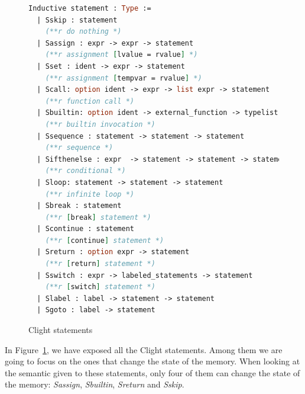 \documentclass[11pt]{sdm}
\begin{document}
\begin{figure}[!ht]
\centering
\begin{lstlisting}[language=Caml]
Inductive statement : Type :=
  | Sskip : statement
    (**r do nothing *)
  | Sassign : expr -> expr -> statement
    (**r assignment [lvalue = rvalue] *)
  | Sset : ident -> expr -> statement 
    (**r assignment [tempvar = rvalue] *)
  | Scall: option ident -> expr -> list expr -> statement
    (**r function call *)
  | Sbuiltin: option ident -> external_function -> typelist -> list expr -> statement
    (**r builtin invocation *)
  | Ssequence : statement -> statement -> statement 
    (**r sequence *)
  | Sifthenelse : expr  -> statement -> statement -> statement
    (**r conditional *)
  | Sloop: statement -> statement -> statement 
    (**r infinite loop *)
  | Sbreak : statement   
    (**r [break] statement *)
  | Scontinue : statement
    (**r [continue] statement *)
  | Sreturn : option expr -> statement 
    (**r [return] statement *)
  | Sswitch : expr -> labeled_statements -> statement
    (**r [switch] statement *)
  | Slabel : label -> statement -> statement
  | Sgoto : label -> statement
\end{lstlisting}
\caption{Clight statements}
\label{clight_statements}
\end{figure}

In Figure~\ref{clight_statements}, we have exposed all the Clight statements. Among them we are going to focus on the ones that change the state of the memory. When looking at the semantic given to these statements, only four of them can change the state of the memory: \textit{Sassign}, \textit{Sbuiltin}, \textit{Sreturn} and \textit{Sskip}.
\end{document}
